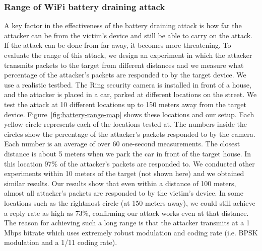 \subsubsection{Range of WiFi battery draining attack}
A key factor in the effectiveness of the battery draining attack is how far the attacker can be from the victim's device and still be able to carry on the attack. If the attack can be done from far away, it becomes more threatening. 
To evaluate the range of this attack, we design an experiment in which the attacker transmits packets to the target from different distances and we measure what percentage of the attacker's packets are responded to by the target device.
We use a realistic testbed. The Ring security camera is installed in front of a house, and the attacker is placed in a car, parked at different locations on the street. We test the attack at 10 different locations up to 150 meters away from the target device. Figure~\ref{fig:battery-range-map} 
shows these locations and our setup. Each yellow circle represents each of the locations tested at. The numbers inside the circles show the percentage of the attacker's packets responded to by the camera.
Each number is an average of over 60 one-second measurements.
The closest distance is about 5 meters when we park the car in front of the target house. 
In this location 97\% of the attacker's packets are responded to.
We conducted other experiments within 10 meters of the target (not shown here) and we obtained similar results. Our results show that even within a distance of 100 meters, almost all attacker's packets are responded to by the victim's device. In some locations such as the rightmost circle (at 150 meters away), we could still achieve a reply rate as high as 73\%, confirming our attack works even at that distance. The reason for achieving such a long range is that the attacker transmits at a 1 Mbps bitrate which uses extremely robust modulation and coding rate (i.e. BPSK modulation and a 1/11 coding rate). 


